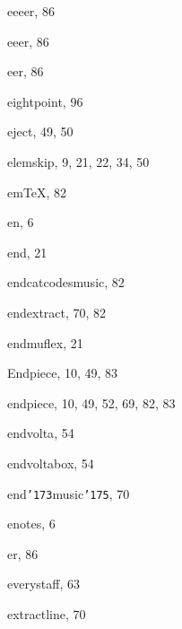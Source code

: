 \begin{theindex}
  \indexspace

  \item {\Bslash eeeer}, 86
  \item {\Bslash eeer}, 86
  \item {\Bslash eer}, 86
  \item {\Bslash eightpoint}, 96
  \item {\Bslash eject}, 49, 50
  \item {\Bslash elemskip}, 9, 21, 22, 34, 50
  \item em\TeX, 82
  \item {\Bslash en}, 6
  \item {\Bslash end}, 21
  \item {\Bslash endcatcodesmusic}, 82
  \item {\Bslash endextract}, 70, 82
  \item {\Bslash endmuflex}, 21
  \item {\Bslash Endpiece}, 10, 49, 83
  \item {\Bslash endpiece}, 10, 49, 52, 69, 82, 83
  \item {\Bslash endvolta}, 54
  \item {\Bslash endvoltabox}, 54
  \item {\Bslash end{\tt  \char '173}music{\tt  \char '175}}, 70
  \item {\Bslash enotes}, 6
  \item {\Bslash er}, 86
  \item {\Bslash everystaff}, 63
  \item {\Bslash extractline}, 70

  \indexspace


\end{theindex}
